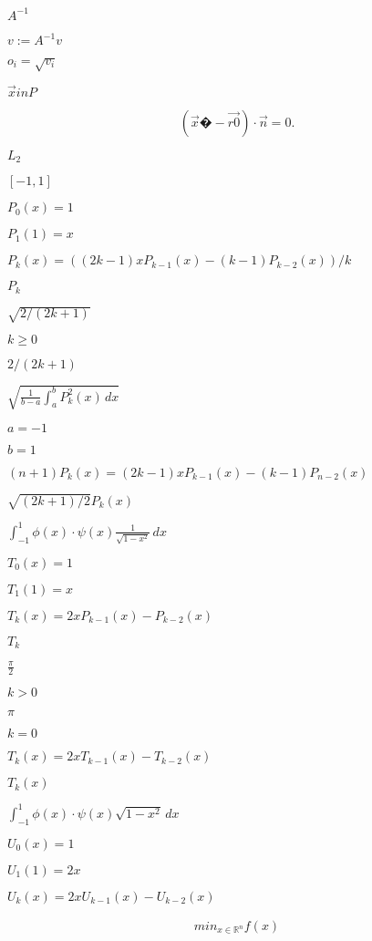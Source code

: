 \documentclass{article}
\begin{document}
$ A^{-1} $
\pagebreak

$ v := A^{-1} v $
\pagebreak

$o_i=\sqrt {v_i}$
\pagebreak

$ \vec{x} in P $
\pagebreak

\[ (\vec{x}�- \vec{r0}) \cdot \vec{n} = 0. \]
\pagebreak

$L_2$
\pagebreak

$[-1, 1]$
\pagebreak

$P_0 (x) = 1$
\pagebreak

$P_1 (1) = x$
\pagebreak

$P_k (x) = ((2 k - 1) x P_{k-1} (x) - (k - 1) P_{k-2} (x)) / k$
\pagebreak

$P_k$
\pagebreak

$\sqrt {2 / (2 k + 1)}$
\pagebreak

$k \ge 0$
\pagebreak

$2 / (2 k + 1)$
\pagebreak

$\sqrt {\frac{1}{b-a} \int_a^b P_k^2 (x) \, dx}$
\pagebreak

$a=-1$
\pagebreak

$b=1$
\pagebreak

$(n+1) P_k (x) = (2 k - 1) x P_{k-1} (x) - (k - 1) P_{n-2} (x)$
\pagebreak

$\sqrt {(2 k + 1) / 2} P_k (x)$
\pagebreak

$ \int_{-1}^1 \phi (x) \cdot \psi (x) \frac{1}{\sqrt {1 - x^2}} \, dx $
\pagebreak

$T_0 (x) = 1$
\pagebreak

$T_1 (1) = x$
\pagebreak

$T_k (x) = 2 x P_{k-1} (x) - P_{k-2} (x)$
\pagebreak

$T_k$
\pagebreak

$\tfrac{\pi}{2}$
\pagebreak

$k > 0$
\pagebreak

$\pi$
\pagebreak

$k = 0$
\pagebreak

$T_k (x) = 2 x T_{k-1} (x) - T_{k-2} (x)$
\pagebreak

$T_k (x)$
\pagebreak

$ \int_{-1}^1 \phi (x) \cdot \psi (x) \sqrt {1 - x^2} \, dx $
\pagebreak

$U_0 (x) = 1$
\pagebreak

$U_1 (1) = 2 x$
\pagebreak

$U_k (x) = 2 x U_{k-1} (x) - U_{k-2} (x)$
\pagebreak

\begin{eqnarray*} min_{x \in \mathbb{R}^n} f(x) \end{eqnarray*}
\pagebreak
\end{document}

